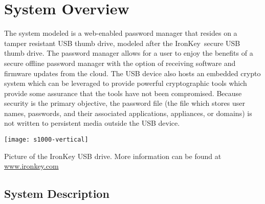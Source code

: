 \chapter{System Overview}
\label{ch:System Overview}
The system modeled is a web-enabled password manager that resides on a
tamper resistant USB thumb drive, modeled after the
IronKey\texttrademark~secure USB thumb drive. The password manager
allows for a user to enjoy the benefits of a secure offline password
manager with the option of receiving software and firmware updates from the
cloud. The USB device also hosts an embedded crypto system which can be
leveraged to provide powerful cryptographic tools which provide some assurance
that the tools have not been compromised. Because security is the primary objective, the password file (the file which stores user names, passwords, and their associated applications, appliances, or domains) is not written to persistent media outside the USB device.

\begin{marginfigure}%
\centering
  \texttt{[image: s1000-vertical]}
  \caption{Picture of the IronKey USB drive.  More information can be
found at \url{www.ironkey.com}}
  \label{fig:ik}
\end{marginfigure}



\section{System Description}
\label{sec:sysdesc}

